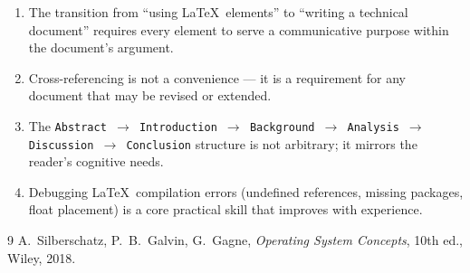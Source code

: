 \documentclass[11pt, a4paper]{article}
\begin{document}
\begin{enumerate}[nosep]
    \item The transition from ``using \LaTeX\ elements'' to ``writing a technical document'' requires every element to serve a communicative purpose within the document's argument.
    \item Cross-referencing is not a convenience --- it is a requirement for any document that may be revised or extended.
    \item The \texttt{Abstract $\rightarrow$ Introduction $\rightarrow$ Background $\rightarrow$ Analysis $\rightarrow$ Discussion $\rightarrow$ Conclusion} structure is not arbitrary; it mirrors the reader's cognitive needs.
    \item Debugging \LaTeX\ compilation errors (undefined references, missing packages, float placement) is a core practical skill that improves with experience.
\end{enumerate}

\begin{thebibliography}{9}
 A.\ Silberschatz, P.\ B.\ Galvin, G.\ Gagne, \textit{Operating System Concepts}, 10th ed., Wiley, 2018.
\end{thebibliography}
\end{document}
